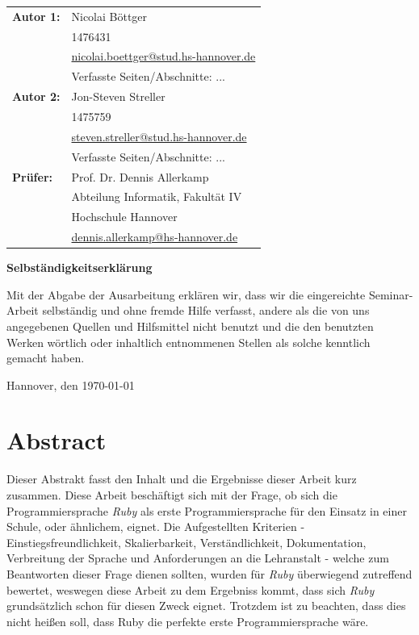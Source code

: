 \documentclass[12pt,DIV=14, version=first, BCOR=10mm,a4paper,twoside,parskip=half-,headsepline,headinclude]{scrartcl}
\begin{document}
  \newpage \thispagestyle{empty}
 \begin{tabular}{ll}
{\bfseries\sffamily Autor 1:} &  Nicolai Böttger \\
            & 1476431 \\
            & \href{mailto:nicolai.boettger@stud.hs-hannover.de}{nicolai.boettger@stud.hs-hannover.de} \\
            & Verfasste Seiten/Abschnitte: ...
            \\[5ex]
{\bfseries\sffamily Autor 2:} & Jon-Steven Streller \\
            & 1475759 \\
            & \href{mailto:steven.streller@stud.hs-hannover.de}{steven.streller@stud.hs-hannover.de} \\
           & Verfasste Seiten/Abschnitte: ... \\[5ex]
 {\bfseries\sffamily Prüfer:} &Prof. Dr. Dennis Allerkamp \\
          & Abteilung Informatik, Fakultät IV \\
         & Hochschule Hannover \\
        & \href{mailto:dennis.allerkamp@hs-hannover.de}{dennis.allerkamp@hs-hannover.de}
\end{tabular}

\vfill

\begin{center} \sffamily\bfseries Selbständigkeitserklärung \end{center}

Mit der Abgabe der Ausarbeitung erklären wir, dass wir die eingereichte Seminar-Arbeit
selbständig und ohne fremde Hilfe verfasst, andere als die von uns angegebenen Quellen
und Hilfsmittel nicht benutzt und die den benutzten Werken wörtlich oder
inhaltlich entnommenen Stellen als solche kenntlich gemacht haben.
\vspace*{7ex}

Hannover, den \today \hfill

\pagebreak
\section{Abstract}
\begin{flushleft}
Dieser Abstrakt fasst den Inhalt und die Ergebnisse dieser Arbeit kurz zusammen. Diese Arbeit beschäftigt sich mit der Frage, ob sich die Programmiersprache \textit{\glqq Ruby\grqq} als erste Programmiersprache für den Einsatz in einer Schule, oder ähnlichem, eignet. Die Aufgestellten Kriterien - Einstiegsfreundlichkeit, Skalierbarkeit, Verständlichkeit, Dokumentation, Verbreitung der Sprache und Anforderungen an die Lehranstalt - welche zum Beantworten dieser Frage dienen sollten, wurden für \textit{\glqq Ruby\grqq} überwiegend zutreffend bewertet, weswegen diese Arbeit zu dem Ergebniss kommt, dass sich \textit{\glqq Ruby\grqq} grundsätzlich schon für diesen Zweck eignet. Trotzdem ist zu beachten, dass dies nicht heißen soll, dass Ruby die perfekte erste Programmiersprache wäre.
\end{flushleft}
  \tableofcontents  %
\end{document}
